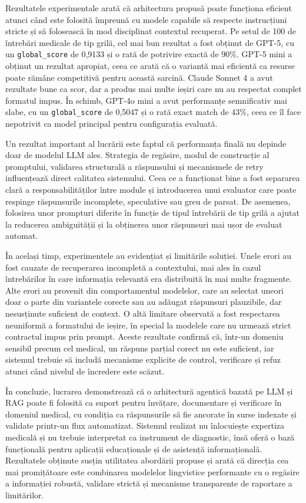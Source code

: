 \documentclass[12pt, a4paper, oneside, romanian]{teza-upb}
\begin{document}
Rezultatele experimentale arată că arhitectura propusă poate funcționa eficient atunci când este folosită împreună cu modele capabile să respecte instrucțiuni stricte și să folosească în mod disciplinat contextul recuperat. Pe setul de 100 de întrebări medicale de tip grilă, cel mai bun rezultat a fost obținut de GPT-5, cu un \texttt{global\_score} de 0,9133 și o rată de potrivire exactă de 90\%. GPT-5 mini a obținut un rezultat apropiat, ceea ce arată că o variantă mai eficientă ca resurse poate rămâne competitivă pentru această sarcină. Claude Sonnet 4 a avut rezultate bune ca scor, dar a produs mai multe ieșiri care nu au respectat complet formatul impus. În schimb, GPT-4o mini a avut performanțe semnificativ mai slabe, cu un \texttt{global\_score} de 0,5047 și o rată exact match de 43\%, ceea ce îl face nepotrivit ca model principal pentru configurația evaluată.

Un rezultat important al lucrării este faptul că performanța finală nu depinde doar de modelul LLM ales. Strategia de regăsire, modul de construcție al promptului, validarea structurală a răspunsului și mecanismele de retry influențează direct calitatea sistemului. Ceea ce a funcționat bine a fost separarea clară a responsabilităților între module și introducerea unui evaluator care poate respinge răspunsurile incomplete, speculative sau greu de parsat. De asemenea, folosirea unor prompturi diferite în funcție de tipul întrebării de tip grilă a ajutat la reducerea ambiguității și la obținerea unor răspunsuri mai ușor de evaluat automat.

În același timp, experimentele au evidențiat și limitările soluției. Unele erori au fost cauzate de recuperarea incompletă a contextului, mai ales în cazul întrebărilor în care informația relevantă era distribuită în mai multe fragmente. Alte erori au provenit din comportamentul modelelor, care au selectat uneori doar o parte din variantele corecte sau au adăugat răspunsuri plauzibile, dar nesusținute suficient de context. O altă limitare observată a fost respectarea neuniformă a formatului de ieșire, în special la modelele care nu urmează strict contractul impus prin prompt. Aceste rezultate confirmă că, într-un domeniu sensibil precum cel medical, un răspuns parțial corect nu este suficient, iar sistemul trebuie să includă mecanisme explicite de control, verificare și refuz atunci când nivelul de încredere este scăzut.

În concluzie, lucrarea demonstrează că o arhitectură agentică bazată pe LLM și RAG poate fi folosită ca suport pentru învățare, documentare și verificare în domeniul medical, cu condiția ca răspunsurile să fie ancorate în surse indexate și validate printr-un flux automatizat. Sistemul realizat nu înlocuiește expertiza medicală și nu trebuie interpretat ca instrument de diagnostic, însă oferă o bază funcțională pentru aplicații educaționale și de asistență informațională. Rezultatele obținute susțin utilitatea abordării propuse și arată că direcția cea mai promițătoare este combinarea modelelor lingvistice performante cu o regăsire a informației robustă, validare strictă și mecanisme transparente de raportare a limitărilor.
\end{document}
